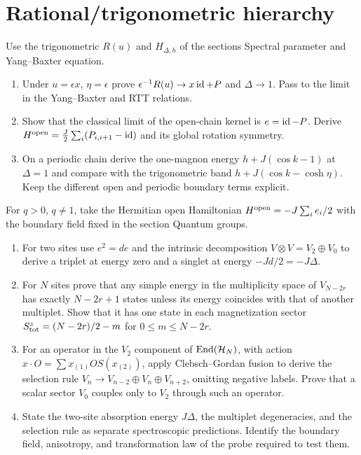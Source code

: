 \section{Rational/trigonometric hierarchy}

\begin{exercise}
Use the trigonometric $R(u)$ and $H_{\Delta,h}$ of the
sections Spectral parameter and Yang--Baxter equation.
\begin{enumerate}[label=(\alph*)]
\item Under $u=\epsilon x$, $\eta=\epsilon$ prove
$\epsilon^{-1}R(u)\to x\operatorname{id}+P$ and $\Delta\to1$.
Pass to the limit in the Yang--Baxter and RTT relations.
\item Show that the classical limit of the open-chain kernel
is $e=\operatorname{id}-P$. Derive
$H^{\rm open}=\frac J2\sum_i(P_{i,i+1}-\operatorname{id})$ and its
global rotation symmetry.
\item On a periodic chain derive the one-magnon energy
$h+J(\cos k-1)$ at $\Delta=1$ and compare with the
trigonometric band $h+J(\cos k-\cosh\eta)$.
Keep the different open and periodic boundary terms explicit.
\end{enumerate}
\end{exercise}

\begin{exercise}
For $q>0$, $q\ne1$, take the Hermitian open Hamiltonian
$H^{\rm open}=-J\sum_i e_i/2$ with the boundary field fixed
in the section Quantum groups.
\begin{enumerate}[label=(\alph*)]
\item For two sites use $e^2=de$ and the intrinsic decomposition
$V\otimes V=V_2\oplus V_0$ to derive a triplet at energy zero
and a singlet at energy $-Jd/2=-J\Delta$.
\item For $N$ sites prove that any simple energy in the
multiplicity space of $V_{N-2r}$ has exactly $N-2r+1$
states unless its energy coincides with that of another
multiplet. Show that it has one state in each magnetization
sector $S^z_{\rm tot}=(N-2r)/2-m$ for $0\le m\le N-2r$.
\item For an operator in the $V_2$ component of
$\operatorname{End}(\mathcal H_N)$, with action
$x\cdot O=\sum x_{(1)}OS(x_{(2)})$, apply Clebsch--Gordan
fusion to derive the selection rule
$V_n\to V_{n-2}\oplus V_n\oplus V_{n+2}$, omitting
negative labels. Prove that a scalar sector $V_0$ couples
only to $V_2$ through such an operator.
\item State the two-site absorption energy $J\Delta$, the
multiplet degeneracies, and the selection rule as separate
spectroscopic predictions. Identify the boundary field,
anisotropy, and transformation law of the probe required
to test them.
\end{enumerate}
\end{exercise}
